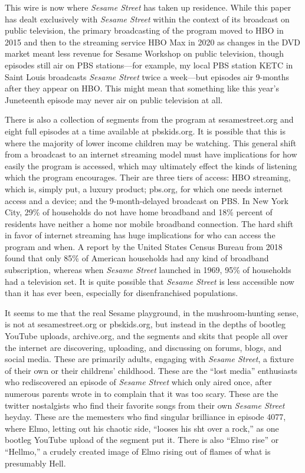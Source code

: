 \documentclass[12pt,letterpaper]{article}
\newcommand{\ses}{\textit{Sesame Street }}
\begin{document}
	This wire is now where \ses has taken up residence. 
	While this paper has dealt exclusively with \ses within the context of 
	its 
	broadcast on public television, the primary broadcasting of the program
	moved to HBO in 2015 and then to the streaming service HBO Max in 2020 
	as changes in the DVD market meant 
	less revenue for Sesame Workshop on public television, though episodes 
	still air on PBS stations---for example, my local PBS station KETC in 
	Saint
	Louis broadcasts \textit{Sesame Street} twice a week---but episodes air
	9-months after they appear on HBO.\autocite{Koblin} This 
	might mean that something like this year's Juneteenth episode may never 
	air on public television at all. 

	There is also a collection of segments from the program at 
	sesamestreet.org and eight full 
	episodes at a time available at pbskids.org. It is possible that this is
	where the majority of lower income children may be watching. This 
	general shift from a broadcast to an internet streaming model must have
	implications for how easily the program is accessed, which may 
	ultimately effect the kinds of listening which the program encourages.
	Their are three tiers of access: HBO streaming, which is, simply put,
	a luxury 
	product; pbs.org, for which one needs internet access and a device; and
	the 9-month-delayed broadcast on PBS. In New York City, 29\% of 
	households do not have home broadband and 18\% percent of residents 
	have neither a home nor mobile broadband connection.\autocite{CTNY} 
	The hard shift in
	favor of internet streaming has huge implications for who can access 
	the program and when. A report by the United States Census Bureau from
	2018 found that only 85\% of American households had any kind of 
	broadband subscription,\autocite[2]{Martin} whereas when \ses launched 
	in 1969, 95\% of 
	households had a television set.\autocite[142]{Steinberg} It is quite 
	possible that \ses is less
	accessible now than it has ever been, especially for disenfranchised
	populations. 

	It seems to me that the real Sesame playground, in the mushroom-hunting
	sense, is not at 
	sesamestreet.org or pbskids.org, but instead in the depths of bootleg 
	YouTube uploads, archive.org, and the segments and skits that 
	people all over the internet are discovering, uploading, and discussing 
	on forums, blogs, and social media. These are primarily adults, 
	engaging with \textit{Sesame Street}, a fixture of their own or their
	childrens'
	childhood. These are the ``lost media'' 
	enthusiasts who rediscovered an episode of \ses which only aired once, 
	after numerous parents wrote in to complain that it was too 
	scary.\autocite{NBC} These
	are the twitter nostalgists who find their favorite songs from their own
	\ses heyday. These are the memesters who find singular 
	brilliance in episode 4077, where Elmo, letting out his chaotic side, 
	``looses his sh\*t over a rock,'' as one bootleg YouTube upload of the 
	segment put it. There is also ``Elmo rise'' or ``Hellmo,'' a crudely 
	created image of Elmo rising out of flames of what is presumably Hell.
\end{document}
